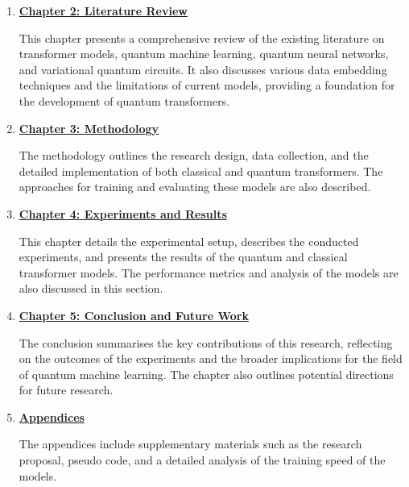 \begin{enumerate}
  \item \textbf{\hyperref[chap:literature]{Chapter 2: Literature Review}}

    This chapter presents a comprehensive review of the existing
    literature on transformer models, quantum machine learning,
    quantum neural networks, and variational quantum circuits. It
    also discusses various data embedding techniques and the
    limitations of current models, providing a foundation for the
    development of quantum transformers.

  \item \textbf{\hyperref[chap:methodology]{Chapter 3: Methodology}}

    The methodology outlines the research design, data collection,
    and the detailed implementation of both classical and quantum
    transformers. The approaches for training and evaluating these
    models are also described.

  \item \textbf{\hyperref[chap:results]{Chapter 4: Experiments and Results}}

    This chapter details the experimental setup, describes the
    conducted experiments, and presents the results of the quantum
    and classical transformer models. The performance metrics and
    analysis of the models are also discussed in this section.

  \item \textbf{\hyperref[chap:conclusion]{Chapter 5: Conclusion and
    Future Work}}

    The conclusion summarises the key contributions of this research,
    reflecting on the outcomes of the experiments and the broader
    implications for the field of quantum machine learning. The
    chapter also outlines potential directions for future research.

  \item \textbf{\hyperref[apx:proposal]{Appendices}}

    The appendices include supplementary materials such as the
    research proposal, pseudo code, and a detailed analysis of the
    training speed of the models.
\end{enumerate}
